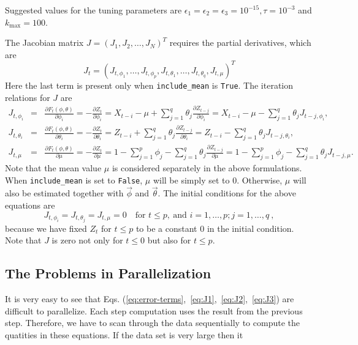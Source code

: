 \documentclass[english,10pt]{llncs}
\begin{document}
Suggested values for the tuning parameters are $\epsilon_1 = \epsilon_2 =
\epsilon_3 = 10^{-15}, \tau = 10^{-3}$ and $k_{\max} = 100$.

The Jacobian matrix $J = {(J_{1}, J_{2}, \ldots, J_N)}^T$ requires the partial derivatives, which are
\begin{equation}
J_t = {(J_{t, \phi_1}, \ldots, J_{t,\phi_p}, J_{t,\theta_1}, \ldots,
  J_{t,\theta_q}, J_{t,\mu})}^T
\end{equation}
Here the last term is present only when \texttt{include\_mean} is
\texttt{True}.
The iteration relations for $J$ are
\begin{eqnarray}
J_{t, \phi_i} &=& \frac{\partial F_t(\phi,\theta)}{\partial \phi_i} =
-\frac{\partial Z_t}{\partial \phi_i} = X_{t-i}-\mu + \sum_{j=1}^q
\theta_j \frac{\partial Z_{t - j}}{\partial \phi_i} = X_{t-i}-\mu - \sum_{j=1}^q
\theta_j J_{t-j,\phi_i}, \label{eq:J1}\\
J_{t, \theta_i}&=&\frac{\partial F_t(\phi,\theta)}{\partial \theta_i} =
-\frac{\partial Z_t}{\partial \theta_i} = Z_{t-i} + \sum_{j =1}^q
\theta_j \frac{\partial Z_{t - j}}{\partial \theta_i} = Z_{t-i} -
\sum_{j=1}^q \theta_j J_{t-j,\theta_i}, \label{eq:J2}\\
J_{t, \mu} &=&\frac{\partial F_t(\phi,\theta)}{\partial \mu} =
-\frac{\partial Z_t}{\partial \mu} = 1 -
\sum_{j=1}^p \phi_j - \sum_{j=1}^q \theta_j \frac{\partial
  Z_{t-j}}{\partial \mu} = 1 - \sum_{j=1}^p \phi_j - \sum_{j=1}^q
\theta_j J_{t-j,\mu}. \label{eq:J3}
\end{eqnarray}
Note that the mean value $\mu$ is considered separately in the above
formulations. When \texttt{include\_mean} is set to \texttt{False}, $\mu$ will be simply
set to 0. Otherwise, $\mu$ will also be estimated together with
$\vec{\phi}$ and $\vec{\theta}$. The initial conditions for the above
equations are
\begin{equation}
J_{t,\phi_i} = J_{t,\theta_j} = J_{t,\mu} = 0 \quad \mbox{for }
t \leq p,\ \mbox{and }i=1,\dots,p; j = 1, \dots, q\ ,
\end{equation}
because we have fixed $Z_t$ for $t\leq p$ to be a constant $0$ in the initial
condition. Note that $J$ is zero not only for $t\leq
0$ but also for $t\leq p$.

\subsection{The Problems in Parallelization}

It is very easy to see that Eqs.
(\ref{eq:error-terms},~\ref{eq:J1},~\ref{eq:J2},~\ref{eq:J3}) are
difficult to parallelize. Each step computation uses the result from
the previous step. Therefore, we have to scan through the data
sequentially to compute the quatities in these equations. If the data
set is very large then it 
\end{document}
